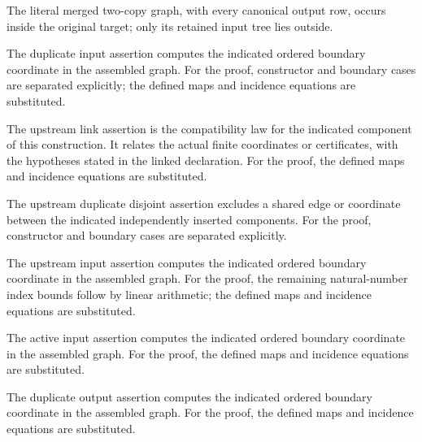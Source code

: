 The literal merged two-copy graph, with every canonical output row, occurs inside the original target; only its retained input tree lies outside.
\par{}

The duplicate input assertion computes the indicated ordered boundary coordinate in the assembled graph.
For the proof, constructor and boundary cases are separated explicitly; the defined maps and incidence equations are substituted.
\par{}

The upstream link assertion is the compatibility law for the indicated component of this construction. It relates the actual finite coordinates or certificates, with the hypotheses stated in the linked declaration.
For the proof, the defined maps and incidence equations are substituted.
\par{}

The upstream duplicate disjoint assertion excludes a shared edge or coordinate between the indicated independently inserted components.
For the proof, constructor and boundary cases are separated explicitly.
\par{}

The upstream input assertion computes the indicated ordered boundary coordinate in the assembled graph.
For the proof, the remaining natural-number index bounds follow by linear arithmetic; the defined maps and incidence equations are substituted.
\par{}

The active input assertion computes the indicated ordered boundary coordinate in the assembled graph.
For the proof, the defined maps and incidence equations are substituted.
\par{}

The duplicate output assertion computes the indicated ordered boundary coordinate in the assembled graph.
For the proof, the defined maps and incidence equations are substituted.
\par{}

